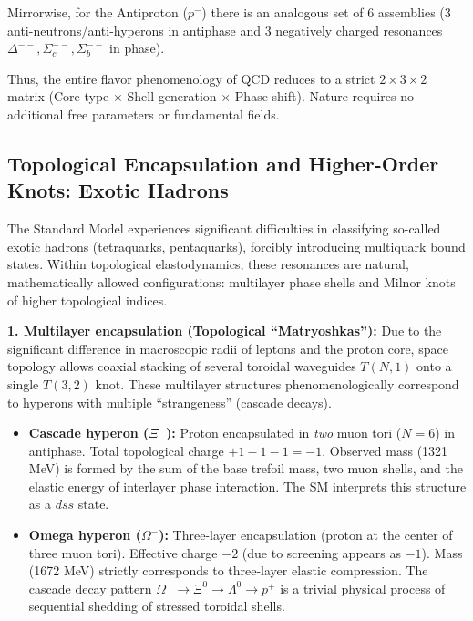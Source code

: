\documentclass[11pt,a4paper]{article}
\begin{document}
Mirrorwise, for the Antiproton ($p^-$) there is an analogous set of 6 assemblies (3 anti-neutrons/anti-hyperons in antiphase and 3 negatively charged resonances $\Delta^{--}, \Sigma_c^{--}, \Sigma_b^{--}$ in phase).

Thus, the entire flavor phenomenology of QCD reduces to a strict $2 \times 3 \times 2$ matrix (Core type $\times$ Shell generation $\times$ Phase shift). Nature requires no additional free parameters or fundamental fields.

\subsection{Topological Encapsulation and Higher-Order Knots: Exotic Hadrons}
The Standard Model experiences significant difficulties in classifying so-called exotic hadrons (tetraquarks, pentaquarks), forcibly introducing multiquark bound states. Within topological elastodynamics, these resonances are natural, mathematically allowed configurations: multilayer phase shells and Milnor knots of higher topological indices.

\textbf{1. Multilayer encapsulation (Topological ``Matryoshkas''):}
Due to the significant difference in macroscopic radii of leptons and the proton core, space topology allows coaxial stacking of several toroidal waveguides $T(N,1)$ onto a single $T(3,2)$ knot. These multilayer structures phenomenologically correspond to hyperons with multiple ``strangeness'' (cascade decays).
\begin{itemize}
\item \textbf{Cascade hyperon ($\Xi^-$):} Proton encapsulated in \textit{two} muon tori ($N=6$) in antiphase. Total topological charge $+1 - 1 - 1 = -1$. Observed mass (1321 MeV) is formed by the sum of the base trefoil mass, two muon shells, and the elastic energy of interlayer phase interaction. The SM interprets this structure as a $dss$ state.
\item \textbf{Omega hyperon ($\Omega^-$):} Three-layer encapsulation (proton at the center of three muon tori). Effective charge $-2$ (due to screening appears as $-1$). Mass (1672 MeV) strictly corresponds to three-layer elastic compression. The cascade decay pattern $\Omega^- \to \Xi^0 \to \Lambda^0 \to p^+$ is a trivial physical process of sequential shedding of stressed toroidal shells.
\end{itemize}
\end{document}
